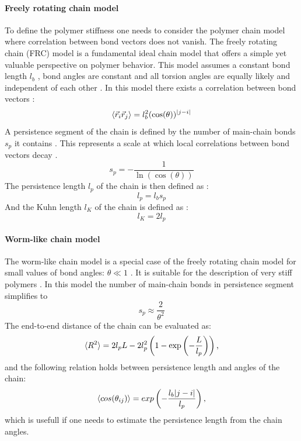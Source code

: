 \documentclass[
    paper=A4,pagesize=automedia,fontsize=12pt,
    BCOR=15mm,DIV=22,
    twoside,headinclude,footinclude=false,
    fleqn,             %
    bibliography=totocnumbered,          %
    listof=totoc,                %
    listof=flat,                 %
    cleardoublepage=empty      %
    numbers=endperiod
]{scrartcl}
\begin{document}
\paragraph{Freely rotating chain model}
To define the polymer stiffness one needs to consider the polymer chain model
where correlation between bond vectors does not vanish.
The freely rotating chain (FRC) model is a fundamental ideal chain model 
that offers a simple yet valuable perspective on polymer behavior. 
This model assumes a constant bond length $l_b$ \cite{Rub_Colby_PolyPhy:2005}, 
bond angles are constant \cite{Rub_Colby_PolyPhy:2005} and
all torsion angles are equally likely and independent of each other \cite{Rub_Colby_PolyPhy:2005}.
In this model there exists a correlation between bond vectors \cite{Rub_Colby_PolyPhy:2005}:
\begin{equation}
    \langle\vec{r}_i \vec{r}_j\rangle = l_b^2 (\cos(\theta))^{|j-i|}
\end{equation}
A persistence segment of the chain is defined by the number of main-chain bonds $s_p$ 
it contains \cite{Rub_Colby_PolyPhy:2005}. This represents a scale at which local 
correlations between bond vectors decay \cite{Rub_Colby_PolyPhy:2005}.
\begin{equation}
    s_p = - \frac{1}{\ln(\cos(\theta))}
\end{equation}
The persistence length $l_p$ of the chain is then defined as \cite{Rub_Colby_PolyPhy:2005}:
\begin{equation}
    l_p = l_b s_p
\end{equation}
And the Kuhn length $l_K$ of the chain is defined as \cite{Rub_Colby_PolyPhy:2005}:
\begin{equation}
    l_K = 2 l_p
\end{equation}

\paragraph{Worm-like chain model}
The worm-like chain model is a special case of the freely rotating chain model for
small values of bond angles: $\theta \ll 1$ \cite{Rub_Colby_PolyPhy:2005}.
It is suitable for the description of very stiff polymers \cite{Rub_Colby_PolyPhy:2005}.
In this model the number of main-chain bonds in persistence segment simplifies to 
\begin{equation}
    s_p \approx \frac{2}{\theta^2}
\end{equation}
The end-to-end distance of the chain can be evaluated as:
\begin{equation}
    \langle R^2\rangle = 2 l_p L - 2 l_p^2 \left(1-\exp\left(-\frac{L}{l_p}\right)\right) \text{,}
\end{equation}
and the following relation holds between persistence length and angles of the chain:
\begin{equation} \label{eq:worm-like-chain-cos-theta-ij}
    \langle cos(\theta_{ij})\rangle = exp\left(-\frac{l_b |j-i|}{l_p}\right) \text{,}
\end{equation}
which is usefull if one needs to estimate the persistence length from the chain angles.
\end{document}
